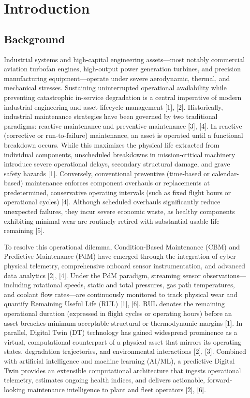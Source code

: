 \documentclass[12pt,a4paper]{article}
\begin{document}
\section{Introduction}

\subsection{Background}
Industrial systems and high-capital engineering assets—most notably commercial aviation turbofan engines, high-output power generation turbines, and precision manufacturing equipment—operate under severe aerodynamic, thermal, and mechanical stresses. Sustaining uninterrupted operational availability while preventing catastrophic in-service degradation is a central imperative of modern industrial engineering and asset lifecycle management [1], [2]. Historically, industrial maintenance strategies have been governed by two traditional paradigms: reactive maintenance and preventive maintenance [3], [4]. In reactive (corrective or run-to-failure) maintenance, an asset is operated until a functional breakdown occurs. While this maximizes the physical life extracted from individual components, unscheduled breakdowns in mission-critical machinery introduce severe operational delays, secondary structural damage, and grave safety hazards [1]. Conversely, conventional preventive (time-based or calendar-based) maintenance enforces component overhauls or replacements at predetermined, conservative operating intervals (such as fixed flight hours or operational cycles) [4]. Although scheduled overhauls significantly reduce unexpected failures, they incur severe economic waste, as healthy components exhibiting minimal wear are routinely retired with substantial usable life remaining [5].

To resolve this operational dilemma, Condition-Based Maintenance (CBM) and Predictive Maintenance (PdM) have emerged through the integration of cyber-physical telemetry, comprehensive onboard sensor instrumentation, and advanced data analytics [2], [4]. Under the PdM paradigm, streaming sensor observations—including rotational speeds, static and total pressures, gas path temperatures, and coolant flow rates—are continuously monitored to track physical wear and quantify Remaining Useful Life (RUL) [1], [6]. RUL denotes the remaining operational duration (expressed in flight cycles or operating hours) before an asset breaches minimum acceptable structural or thermodynamic margins [1]. In parallel, Digital Twin (DT) technology has gained widespread prominence as a virtual, computational counterpart of a physical asset that mirrors its operating states, degradation trajectories, and environmental interactions [2], [3]. Combined with artificial intelligence and machine learning (AI/ML), a predictive Digital Twin provides an extensible computational architecture that ingests operational telemetry, estimates ongoing health indices, and delivers actionable, forward-looking maintenance intelligence to plant and fleet operators [2], [6].
\end{document}
